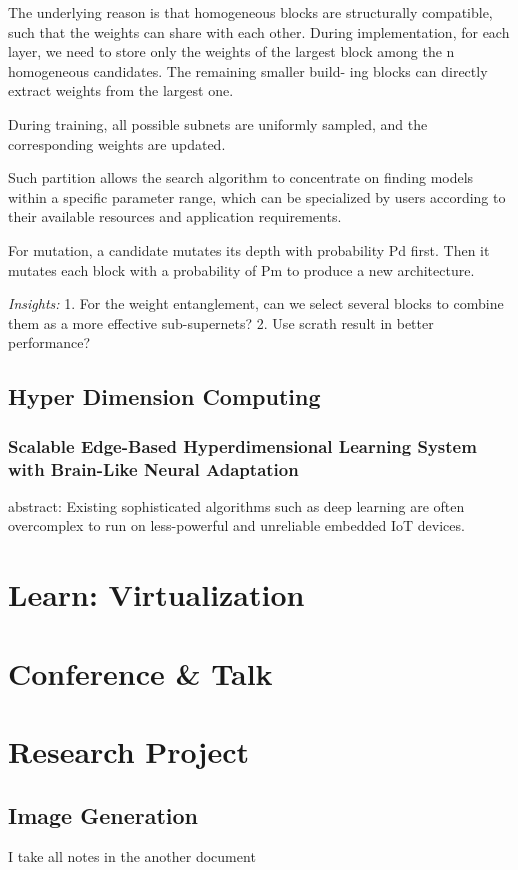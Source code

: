 \documentclass[UTF8]{article}
\begin{document}
The underlying reason is that homogeneous blocks are structurally compatible, such that the weights can share with each other. During implementation, for each layer, we need to store only the weights of the largest block among the n homogeneous candidates. The remaining smaller build- ing blocks can directly extract weights from the largest one.

During training, all possible subnets are uniformly sampled, and the corresponding weights are updated.

Such partition allows the search algorithm to concentrate on finding models within a specific parameter range, which can be specialized by users according to their available resources and application requirements.

For mutation, a candidate mutates its depth with probability Pd first. Then it mutates each block with a probability of Pm to produce a new architecture.

\emph{Insights:} 
1. For the weight entanglement, can we select several blocks to combine them as a more effective sub-supernets?  2. Use scrath result in better performance?
\subsection{Hyper Dimension Computing}
\subsubsection{Scalable Edge-Based Hyperdimensional Learning System with Brain-Like Neural Adaptation}
abstract:
Existing sophisticated algorithms such as deep learning are often overcomplex to run on less-powerful and unreliable embedded IoT devices. 

\section{Learn: Virtualization}
\section{Conference \& Talk}
\section{Research Project}
\subsection{Image Generation}
I take all notes in the another document
\end{document}
